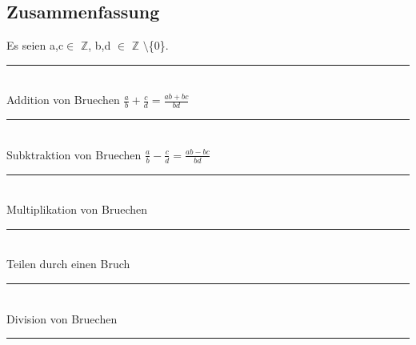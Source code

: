 \documentclass[../AbiMappe_Mathe.tex]{subfiles}
\begin{document}
\subsection{Zusammenfassung}
Es seien a,c$\in$ $\mathds{Z}$, b,d $\in$ $\mathds{Z}$ $\setminus$\{0\}.\\
\noindent\rule{4cm}{0.4pt}\\
Addition von Bruechen	 \hspace{2cm}$\frac{a}{b}+\frac{c}{d}=\frac{ab+bc}{bd}$\\
\noindent\rule{4cm}{0.4pt}\\
Subktraktion von Bruechen \hspace{2cm}	$\frac{a}{b}-\frac{c}{d}=\frac{ab-bc}{bd}$\\
\noindent\rule{4cm}{0.4pt}\\
Multiplikation von Bruechen\\
\noindent\rule{4cm}{0.4pt}\\
Teilen durch einen Bruch\\
\noindent\rule{4cm}{0.4pt}\\
Division von Bruechen\\
\noindent\rule{4cm}{0.4pt}\\
\end{document}
